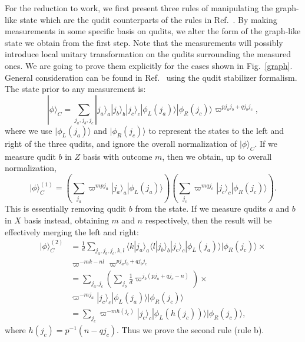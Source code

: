 \documentclass[aps,amsfonts,pra,twocolumn,showpacs]{revtex4-1}
\newcommand{\be}{\begin{equation}}
\newcommand{\ee}{\end{equation}}
\begin{document}
	For the reduction to work, we first present three rules of manipulating the graph-like state which are the qudit counterparts of the rules in Ref.~\cite{Wei2012}. By making measurements in some specific basis on qudits, we alter the form of the graph-like state we obtain from the first step. Note that the measurements will possibly introduce local unitary transformation on the qudits surrounding the measured ones. We are going to prove them explicitly for the cases shown in Fig.~\ref{graph}. General consideration can be found in Ref.~\cite{Bahramgiri2007} using the qudit stabilizer formalism. The state prior to any measurement is:
		\be
		|\phi\rangle_C = \sum_{j_a, j_b, j_c} |j_a\rangle_a |j_b\rangle_b |j_c\rangle_c |\phi_L(j_a)\rangle |\phi_R(j_c)\rangle \varpi^{pj_aj_b+qj_bj_c}, \label{prior_measure}
		\ee
	where we use $|\phi_L(j_a)\rangle$ and $|\phi_R(j_c)\rangle$ to represent the states to the left and right of the three qudits, and ignore the overall normalization of $|\phi\rangle_C$. If we measure qudit $b$ in $Z$ basis with outcome $m$, then we obtain, up to overall normalization,
		\be
		|\phi\rangle_C^{(1)} = \left( \sum_{j_a}\varpi^{mpj_a}|j_a\rangle_a|\phi_L(j_a)\rangle \right) \left( \sum_{j_c}\varpi^{mqj_c}|j_c\rangle_c|\phi_R(j_c)\rangle \right).
		\ee
	This is essentially removing qudit $b$ from the state. If we measure qudits $a$ and $b$ in $X$ basis instead, obtaining $m$ and $n$ respectively, then the result will be effectively merging the left and right:
		\begin{align}
		|\phi\rangle_C^{(2)} & = \frac{1}{d} \sum_{j_a, j_b, j_c, k, l} \langle k|j_a\rangle_a \langle l|j_b\rangle_b |j_c\rangle_c |\phi_L(j_a)\rangle |\phi_R(j_c)\rangle \times \nonumber \\
			& \varpi^{-mk-nl} \varpi^{pj_aj_b+qj_bj_c} \nonumber \\
			& = \sum_{j_a, j_c} \left( \sum_{j_b} \frac{1}{d} \varpi^{j_b(pj_a+qj_c-n)} \right) \times \nonumber \\
			& \varpi^{-mj_a} |j_c\rangle_c |\phi_L(j_a)\rangle |\phi_R(j_c)\rangle \nonumber \\
			& = \sum_{j_c} \varpi^{-mh(j_c)} |j_c\rangle_c |\phi_L(h(j_c))\rangle |\phi_R(j_c)\rangle,
		\end{align}
where $h(j_c) = p^{-1}(n-qj_c)$. Thus we prove the second rule (rule b).
	
\end{document}

